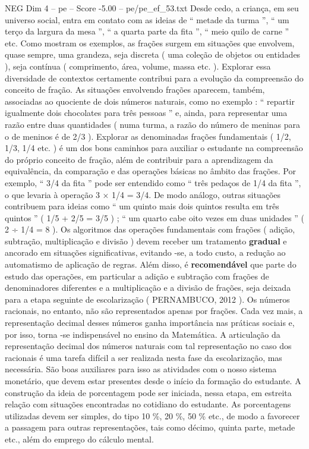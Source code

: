 \begin{textsample}{NEG Dim 4 – pe – Score -5.00 – pe/pe\_ef\_53.txt}
Desde cedo, a criança, em seu universo social, entra em contato com as ideias de “ metade da turma ”, “ um terço da largura da mesa ”, “ a quarta parte da fita ”, “ meio quilo de carne ” etc.
Como mostram os exemplos, as frações surgem em situações que envolvem, quase sempre, uma grandeza, seja discreta ( uma coleção de objetos ou entidades ), seja contínua ( comprimento, área, volume, massa etc. ).
Explorar essa diversidade de contextos certamente contribui para a evolução da compreensão do conceito de fração.
As situações envolvendo frações aparecem, também, associadas ao quociente de dois números naturais, como no exemplo : “ repartir igualmente dois chocolates para três pessoas ” e, ainda, para representar uma razão entre duas quantidades ( numa turma, a razão do número de meninas para o de meninos é de 2/3 ).
Explorar as denominadas frações fundamentais ( 1/2, 1/3, 1/4 etc. ) é um dos bons caminhos para auxiliar o estudante na compreensão do próprio conceito de fração, além de contribuir para a aprendizagem da equivalência, da comparação e das operações básicas no âmbito das frações.
Por exemplo, “ 3/4 da fita ” pode ser entendido como “ três pedaços de 1/4 da fita ”, o que levaria à operação 3 × 1/4 = 3/4.
De modo análogo, outras situações contribuem para ideias como “ um quinto mais dois quintos resulta em três quintos ” ( 1/5 + 2/5 = 3/5 ) ; “ um quarto cabe oito vezes em duas unidades ” ( 2 ÷ 1/4 = 8 ).
Os algoritmos das operações fundamentais com frações ( adição, subtração, multiplicação e divisão ) devem receber um tratamento \textbf{gradual} e ancorado em situações significativas, evitando -se, a todo custo, a redução ao automatismo de aplicação de regras.
Além disso, é \textbf{recomendável} que parte do estudo das operações, em particular a adição e subtração com frações de denominadores diferentes e a multiplicação e a divisão de frações, seja deixada para a etapa seguinte de escolarização ( PERNAMBUCO, 2012 ).
Os números racionais, no entanto, não são representados apenas por frações.
Cada vez mais, a representação decimal desses números ganha importância nas práticas sociais e, por isso, torna -se indispensável no ensino da Matemática.
A articulação da representação decimal dos números naturais com tal representação no caso dos racionais é uma tarefa difícil a ser realizada nesta fase da escolarização, mas necessária.
São boas auxiliares para isso as atividades com o nosso sistema monetário, que devem estar presentes desde o início da formação do estudante.
A construção da ideia de porcentagem pode ser iniciada, nessa etapa, em estreita relação com situações encontradas no cotidiano do estudante.
As porcentagens utilizadas devem ser simples, do tipo 10 \%, 20 \%, 50 \% etc., de modo a favorecer a passagem para outras representações, tais como décimo, quinta parte, metade etc., além do emprego do cálculo mental.

\end{textsample}

